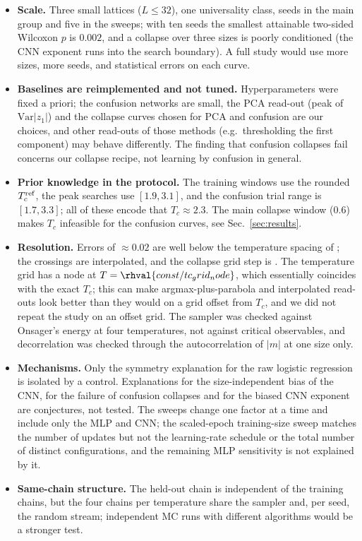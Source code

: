
\begin{itemize}
\item \textbf{Scale.} Three small lattices ($L\le32$), one universality class,  seeds in the main group and five in the sweeps; with ten seeds the smallest attainable two-sided Wilcoxon $p$ is $0.002$, and a collapse over three sizes is poorly conditioned (the CNN exponent runs into the search boundary). A full study would use more sizes, more seeds, and statistical errors on each curve.
\item \textbf{Baselines are reimplemented and not tuned.} Hyperparameters were fixed a priori; the confusion networks are small, the PCA read-out (peak of $\mathrm{Var}|z_1|$) and the collapse curves chosen for PCA and confusion are our choices, and other read-outs of those methods (e.g.\ thresholding the first component) may behave differently. The finding that confusion collapses fail concerns our collapse recipe, not learning by confusion in general.
\item \textbf{Prior knowledge in the protocol.} The training windows use the rounded $T_c^{\rm ref}$, the peak searches use $[1.9,3.1]$, and the confusion trial range is $[1.7,3.3]$; all of these encode that $T_c\approx2.3$. The main collapse window ($0.6$) makes $T_c$ infeasible for the confusion curves, see Sec.~\ref{sec:results}.
\item \textbf{Resolution.} Errors of $\approx0.02$ are well below the temperature spacing of ; the crossings are interpolated, and the collapse grid step is . The temperature grid has a node at $T=\rhval{const/tc_grid_node}$, which essentially coincides with the exact $T_c$; this can make argmax-plus-parabola and interpolated read-outs look better than they would on a grid offset from $T_c$, and we did not repeat the study on an offset grid. The sampler was checked against Onsager's energy at four temperatures, not against critical observables, and decorrelation was checked through the autocorrelation of $|m|$ at one size only.
\item \textbf{Mechanisms.} Only the symmetry explanation for the raw logistic regression is isolated by a control. Explanations for the size-independent bias of the CNN, for the failure of confusion collapses and for the biased CNN exponent are conjectures, not tested. The sweeps change one factor at a time and include only the MLP and CNN; the scaled-epoch training-size sweep matches the number of updates but not the learning-rate schedule or the total number of distinct configurations, and the remaining MLP sensitivity is not explained by it.
\item \textbf{Same-chain structure.} The held-out chain is independent of the training chains, but the four chains per temperature share the sampler and, per seed, the random stream; independent MC runs with different algorithms would be a stronger test.
\end{itemize}
